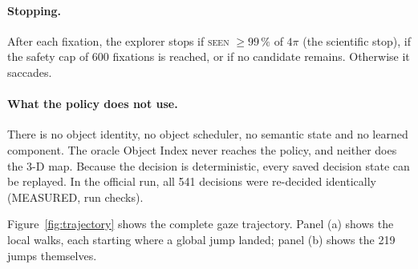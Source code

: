 \documentclass[11pt,a4paper]{article}
\newcommand{\pct}[1]{#1\,\%}
\begin{document}
\paragraph{Stopping.} After each fixation, the explorer stops if \textsc{seen} $\ge \pct{99}$ of $4\pi$ (the
scientific stop), if the safety cap of 600 fixations is reached, or if no candidate remains. Otherwise it saccades.

\paragraph{What the policy does not use.} There is no object identity, no object scheduler, no semantic state and no
learned component. The oracle Object Index never reaches the policy, and neither does the 3-D map. Because the
decision is deterministic, every saved decision state can be replayed. In the official run, all 541 decisions were
re-decided identically (MEASURED, run checks).

Figure~\ref{fig:trajectory} shows the complete gaze trajectory. Panel (a) shows the local walks, each starting where a
global jump landed; panel (b) shows the 219 jumps themselves.
\end{document}
